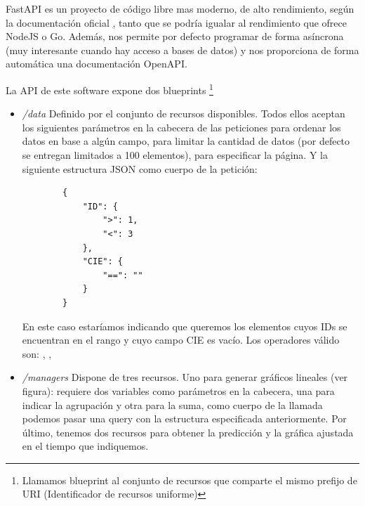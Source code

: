 FastAPI es un proyecto de código libre mas moderno, de alto rendimiento, según la documentación oficial \href{https://fastapi.tiangolo.com}, tanto que se podría igualar al rendimiento que ofrece NodeJS o Go. Además, nos permite por defecto programar de forma asíncrona (muy interesante cuando hay acceso a bases de datos) y nos proporciona de forma automática una documentación OpenAPI.

La API de este software expone dos blueprints \footnote{Llamamos blueprint al conjunto de recursos que comparte el mismo prefijo de URI (Identificador de recursos uniforme)}

\begin{itemize}
    \item \textit{/data} Definido por el conjunto de recursos disponibles. Todos ellos aceptan los siguientes parámetros en la cabecera de las peticiones  para ordenar los datos en base a algún campo,  para limitar la cantidad de datos (por defecto se entregan limitados a 100 elementos),  para especificar la página.
    Y la siguiente estructura JSON como cuerpo de la petición:
    \begin{verbatim}
        {
            "ID": {
                ">": 1,
                "<": 3
            },
            "CIE": {
                "==": ""
            }
        }
    \end{verbatim}
    En este caso estaríamos indicando que queremos los elementos cuyos IDs se encuentran en el rango \codework{]1, 3[} y cuyo campo CIE es vacío. Los operadores válido son: \codeword{==}, \codeword{<}, \codeword{>}

    \item \textit{/managers} Dispone de tres recursos. Uno para generar gráficos lineales (ver figura): requiere dos variables como parámetros en la cabecera, una para indicar la agrupación y otra para la suma, como cuerpo de la llamada podemos pasar una query con la estructura especificada anteriormente. Por último, tenemos dos recursos para obtener la predicción y la gráfica ajustada en el tiempo que indiquemos.
\end{itemize}

